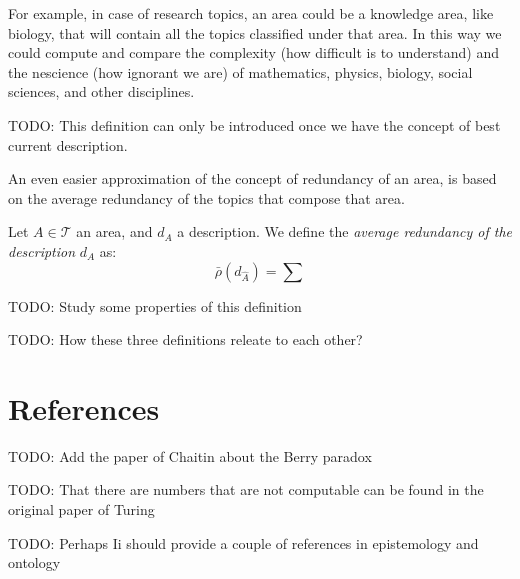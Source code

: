 For example, in case of research topics, an area could be a knowledge area, like biology, that will contain all the topics classified under that area. In this way we could compute and compare the complexity (how difficult is to understand) and the nescience (how ignorant we are) of mathematics, physics, biology, social sciences, and other disciplines.

{\color{red} TODO: This definition can only be introduced once we have the concept of best current description.}

An even easier approximation of the concept of redundancy of an area, is based on the average redundancy of the topics that compose that area.

\begin{definition}
Let $A \in \mathcal{T}$ an area, and $d_A$ a description. We define the \emph{average redundancy of the description} $d_A$ as:
\[
\bar{\rho}(d_{\hat{A}}) = \sum
\]
\end{definition}

{\color{red} TODO: Study some properties of this definition}

{\color{red} TODO: How these three definitions releate to each other?}



%
%

\section*{References}

{\color{red} TODO: Add the paper of Chaitin about the Berry paradox}

{\color{red} TODO: That there are numbers that are not computable can be found in the original paper of Turing}

{\color{red} TODO: Perhaps Ii should provide a couple of references in epistemology and ontology}
